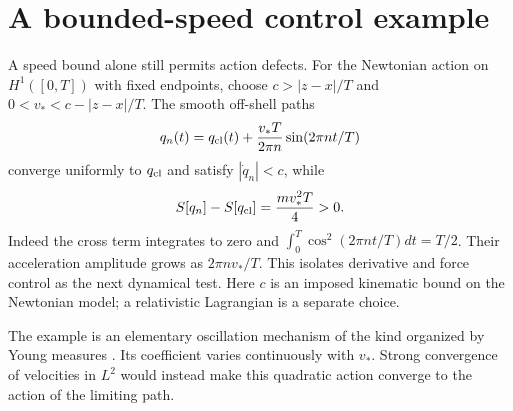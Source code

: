 \documentclass[11pt,a4paper]{article}
\begin{document}
\section{A bounded-speed control example}\label{sec:speed}
A speed bound alone still permits action defects. For the Newtonian action
on $H^1([0,T])$ with fixed endpoints, choose $c>|z-x|/T$ and
$0<v_*<c-|z-x|/T$. The smooth off-shell paths
\begin{equation}\label{eq:sine}
 q_n(t)=q_{\rm cl}(t)+\frac{v_*T}{2\pi n}\sin(2\pi nt/T)
\end{equation}
converge uniformly to $q_{\rm cl}$ and satisfy $|\dot q_n|<c$, while
\begin{equation}\label{eq:sineaction}
 S[q_n]-S[q_{\rm cl}]=\frac{mv_*^2T}{4}>0.
\end{equation}
Indeed the cross term integrates to zero and
$\int_0^T\cos^2(2\pi nt/T)dt=T/2$. Their acceleration amplitude grows as
$2\pi n v_*/T$. This isolates derivative and force control as the next
dynamical test. Here $c$ is an imposed kinematic bound on the Newtonian model;
a relativistic Lagrangian is a separate choice.

The example is an elementary oscillation mechanism of the kind organized by
Young measures \cite[\S3.3]{Rindler2017}. Its coefficient varies continuously
with $v_*$. Strong convergence of velocities in $L^2$ would instead make this
quadratic action converge to the action of the limiting path.
\end{document}
